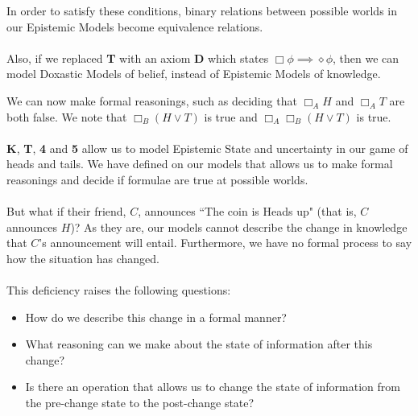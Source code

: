 \documentclass[12pt, a4paper, titlepage]{scrartcl}
\begin{document}
\begin{note}
In order to satisfy these conditions, binary relations between possible worlds
in our Epistemic Models become equivalence relations.\\
\\
Also, if we replaced {\bf T} with an axiom {\bf D} which states $\Box \phi
\implies \diamond \phi$, then we can model Doxastic Models of belief, instead of
Epistemic Models of knowledge.
\end{note}
We can now make formal reasonings, such as deciding that $\Box_A H$ and $\Box_A
T$ are both false.
We note that $\Box_B (H \lor T)$ is true and $\Box_A \Box_B (H \lor T)$ is
true.\\
\\
{\bf K}, {\bf T}, {\bf 4} and {\bf 5} allow us to model Epistemic State and
uncertainty in our game of heads and tails.
We have defined on our models that allows us to make formal reasonings and
decide if formulae are true at possible worlds.\\
\\
But what if their friend, $C$, announces ``The coin is Heads up" (that is,
$C$ announces $H$)?
As they are, our models cannot describe the change in knowledge that
$C$'s announcement will entail.
Furthermore, we have no formal process to say how the situation has changed.\\
\\
This deficiency raises the following questions:
\begin{itemize}
	\item How do we describe this change in a formal manner?
	\item What reasoning can we make about the state of information after this
	change?
	\item Is there an operation that allows us to change the state of information
	from the pre-change state to the post-change state?
\end{itemize}
\end{document}
